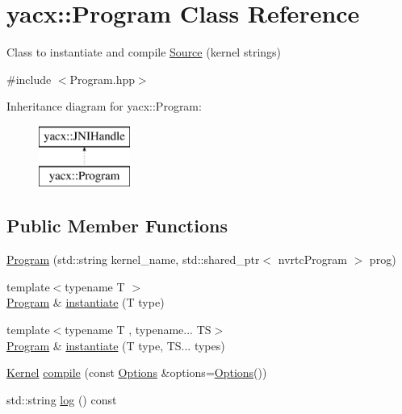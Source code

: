 \hypertarget{classyacx_1_1_program}{}\section{yacx\+:\+:Program Class Reference}
\label{classyacx_1_1_program}


Class to instantiate and compile \hyperlink{classyacx_1_1_source}{Source} (kernel strings)  




{\ttfamily \#include $<$Program.\+hpp$>$}

Inheritance diagram for yacx\+:\+:Program\+:\begin{figure}[H]
\begin{center}
\leavevmode
\includegraphics[height=2.000000cm]{classyacx_1_1_program}
\end{center}
\end{figure}
\subsection*{Public Member Functions}
\begin{DoxyCompactItemize}
\item 
\hyperlink{classyacx_1_1_program_a70cf98f664408ede2787e4505365a82a}{Program} (std\+::string kernel\+\_\+name, std\+::shared\+\_\+ptr$<$ nvrtc\+Program $>$ prog)
\item 
{\footnotesize template$<$typename T $>$ }\\\hyperlink{classyacx_1_1_program}{Program} \& \hyperlink{classyacx_1_1_program_a220a1c9deb8d04152e3118530dd79d1f}{instantiate} (T type)
\item 
{\footnotesize template$<$typename T , typename... TS$>$ }\\\hyperlink{classyacx_1_1_program}{Program} \& \hyperlink{classyacx_1_1_program_ad1800bf0daf8b64c357606a26b6e254d}{instantiate} (T type, T\+S... types)
\item 
\hyperlink{classyacx_1_1_kernel}{Kernel} \hyperlink{classyacx_1_1_program_a2834c7f32be3bba037352a5a5e5114d3}{compile} (const \hyperlink{classyacx_1_1_options}{Options} \&options=\hyperlink{classyacx_1_1_options}{Options}())
\item 
std\+::string \hyperlink{classyacx_1_1_program_a0d9e7de768dcbfb251b83737bcaec772}{log} () const
\end{DoxyCompactItemize}


